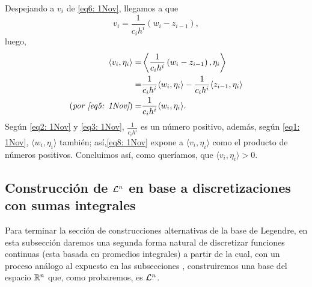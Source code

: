 \begin{itemize}
Despejando a $v_{i}$ de \eqref{eq6: 1Nov}, llegamos a que
\begin{equation}
\label{eq7: 1Nov}
v_{i}= \frac{1}{c_{i}h^{i}} \left( w_{i} -  z_{i-1} \right),
\end{equation}
luego,
\begin{align}
\label{eq8: 1Nov}
\left\langle v_{i}, \eta_{i} \right\rangle = & 
\left\langle \frac{1}{c_{i}h^{i}} \left( w_{i} -  z_{i-1} \right), \eta_{i} 
 \right\rangle \nonumber \\
= & \frac{1}{c_{i}h^{i}} \langle w_{i}, \eta_{i} \rangle -
\frac{1}{c_{i}h^{i}} \langle z_{i-1}, \eta_{i} \rangle \nonumber \\
(\textit{por \eqref{eq5: 1Nov}}) = & \frac{1}{c_{i}h^{i}} \langle w_{i}, \eta_{i} \rangle.
\end{align}
Según 
\eqref{eq2: 1Nov} y 
\eqref{eq3: 1Nov}, $\frac{1}{c_{i}h^{i}}$ es
un número positivo, además, según 
\eqref{eq1: 1Nov}, $\langle w_{i}, \eta_{i} \rangle$ también;
así,\eqref{eq8: 1Nov} expone a $\langle v_{i}, \eta_{i} \rangle$
como el producto de números positivos. 
Concluimos así, como queríamos,
que $\langle v_{i}, \eta_{i} \rangle>0$.
\QEDB
\vspace{0.2cm}


\end{itemize}

\subsection{Construcción de $\mathcal{L}^{n}$ en base a discretizaciones con sumas integrales}
\label{Construcción de Ln en base a discretizaciones con sumas integrales}
Para terminar la sección de construcciones alternativas
de la base de Legendre,
en esta subsección daremos una segunda
forma natural de discretizar funciones continuas
(esta basada en promedios integrales) a partir de 
la cual, con un proceso análogo al expuesto
en las subsecciones , 
construiremos una base del espacio $\mathbb{R}^{n}$
que, como probaremos, es $\mathcal{L}^{n}$.


